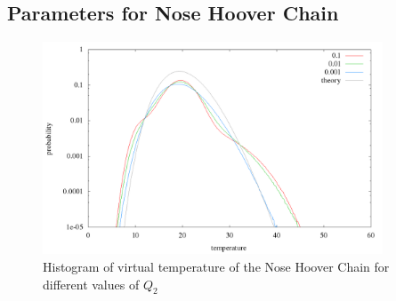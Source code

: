 \subsection{Parameters for Nose Hoover Chain}

\begin{figure}[H]
\centering
\includegraphics[width=0.9\textwidth]{./graphics/Histogramm_tempCol_one_Chain.png}
\caption{Histogram of virtual temperature of the Nose Hoover Chain for different values of $Q_2$ }
\label{im:temp_chain}
\end{figure}



